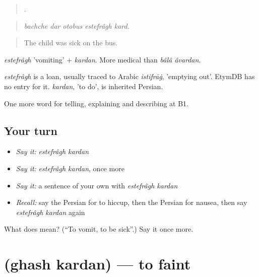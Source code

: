 \begin{quote}
    .
\end{quote}

\begin{quote}
\emph{bachche dar otobus estefrâgh kard.}
\end{quote}

\begin{quote}
The child was sick on the bus.
\end{quote}

\emph{estefrâgh} 'vomiting' + \emph{kardan}. More medical than \emph{bâlâ âvardan}.

\begin{cousinweb}
\emph{estefrâgh} is a loan, usually traced to Arabic \emph{istifrāġ}, 'emptying out'. EtymDB has no entry for it. \emph{kardan}, 'to do', is inherited Persian.
\end{cousinweb}

\begin{grammarlens}[title={What you've built}]
One more word for telling, explaining and describing at B1.
\end{grammarlens}

\subsection*{Your turn}
\begin{itemize}
\raggedright
  \item \emph{Say it:} \emph{estefrâgh kardan}
  \item \emph{Say it:} \emph{estefrâgh kardan}, once more
  \item \emph{Say it:} a sentence of your own with \emph{estefrâgh kardan}
  \item \emph{Recall:} say the Persian for to hiccup, then the Persian for nausea, then say \emph{estefrâgh kardan} again
\end{itemize}

\begin{tcolorbox}[breakable,colback=teal!4,colframe=teal!35!black,title={Before you move on}]
What does   mean? (\textquotedblleft{}To vomit, to be sick\textquotedblright{}.) Say it once more.
\end{tcolorbox}
\section[\texorpdfstring{\fa{غش} \fa{کردن} (ghash kardan)}{غش کردن (ghash kardan)}]{  (ghash kardan) — to faint}


